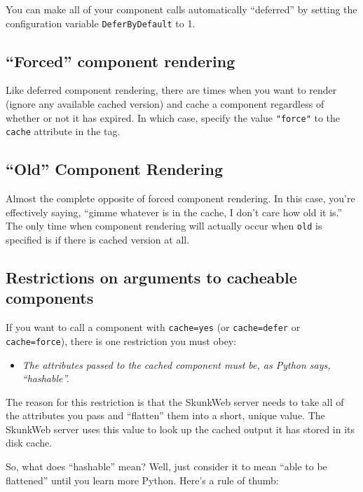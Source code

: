 \documentclass{manual}
\begin{document}
You can make all of your component calls automatically ``deferred'' by
setting the configuration variable
\texttt{DeferByDefault} to 1.

\subsection{``Forced'' component rendering}
Like deferred component rendering, there are times when you want to
render (ignore any available cached version) and cache a component
regardless of whether or not it has expired.  In which case, specify
the value \texttt{"force"} to the \texttt{cache} attribute in the tag.

\subsection{``Old'' Component Rendering}
Almost the complete opposite of forced component rendering.  In this
case, you're effectively saying, ``gimme whatever is in the cache, I
don't care how old it is.''  The only time when component rendering
will actually occur when \texttt{old} is specified is if there is
 cached version at all.

\subsection{Restrictions on arguments to cacheable components}
\label{tagcomponentrestrictions}

If you want to call a component with \texttt{cache=yes} (or
\texttt{cache=defer} or \texttt{cache=force}), there is one
restriction you must obey:

\begin{itemize}
\item \emph{The attributes passed to the cached component must be, 
as Python says, ``hashable''.}
\end{itemize}

The reason for this restriction is that the SkunkWeb server 
needs to take all of the attributes you pass and ``flatten''
them into a short, unique value. The SkunkWeb server uses 
this value to look up the cached output it has stored in 
its disk cache.

So, what does ``hashable'' mean? Well, just consider it 
to mean ``able to be flattened'' until you learn more Python. 
Here's a rule of thumb:
\end{document}
